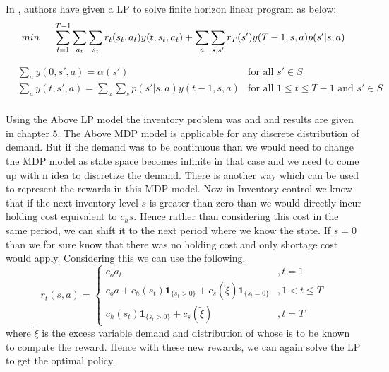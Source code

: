 \documentclass[12pt,a4paper,oneside]{report}
\begin{document}
In \citep{kumar2015finite}, authors have given a LP to solve finite horizon linear program as below:\\
\begin{align*}
\nonumber
min\hspace{0.5cm} \sum_{t=1}^{T-1} \sum_{a_t} \sum_{s_t} r_t(s_t,a_t)y(t,s_t,a_t) + \sum_{a} \sum_{s,s'}r_T(s')y(T-1,s,a)p(s'|s,a)
\end{align*}
\begin{flushleft}
\end{flushleft}
\begin{align*}
&\sum_a y(0,s',a)=\alpha(s')     &\text{for all } s'\in S \\
&\sum_a y(t,s',a)= \sum_a \sum_s p(s'|s,a)y(t-1,s,a)    &\text{for all } 1\leq t\leq T-1 \text{ and } s'\in S   \\  
\end{align*}


Using the Above LP model the inventory problem was and and results are given in chapter 5. The Above MDP model is  applicable for any discrete distribution of demand. But if the demand was to be continuous than we would need to change the MDP model as state space becomes infinite in that case and we need to come up with n idea to discretize the demand. 
There is another way which can be used to represent the rewards in this MDP model. Now in Inventory control we know that if the next inventory level $s$ is greater than zero than we would directly incur holding cost equivalent to $c_hs$. Hence rather than considering this cost in the same period, we can shift it to the next period where we know the state. If $s=0$ than we for sure know that there was no holding cost and only shortage cost would apply. Considering this we can use the following.\\
\begin{equation*}
r_t(s,a)=
\begin{cases}
c_{o}a_t&,t=1\\
c_{o}a + c_h(s_t)\mathbf{1}_{\lbrace s_t>0\rbrace} + c_s(\tilde{\xi})\mathbf{1}_{\lbrace s_t=0\rbrace}&,1<t\leq T\\
c_h(s_t)\mathbf{1}_{\lbrace s_t>0\rbrace} + c_s(\tilde{\xi})&,t=T
\end{cases}
\end{equation*}
\noindent where $\tilde{\xi}$ is the excess variable demand and distribution of whose is to be known to compute the reward.
Hence with these new rewards, we can again solve the LP to get the optimal policy.
\end{document}
